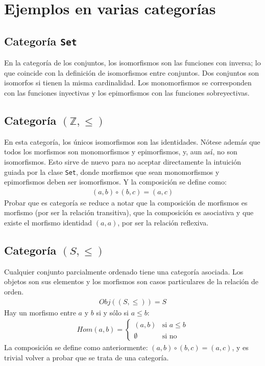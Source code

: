 \documentclass[11pt, fleqn, spanish]{book}
\newcommand{\twopartdef}[4]
{
  \left\{
    \begin{array}{ll}
      #1 & \mbox{si } #2 \\
      #3 & \mbox{si } #4
    \end{array}
  \right.
}
\begin{document}
  \section {Ejemplos en varias categorías}
    \subsection{Categoría \texttt{Set}}
      En la categoría de los conjuntos, los isomorfismos son las funciones con inversa; lo
      que coincide con la definición de isomorfismos entre conjuntos. Dos conjuntos son
      isomorfos si tienen la misma cardinalidad.
      Los monomorfismos se corresponden con las funciones inyectivas y los epimorfismos con
      las funciones sobreyectivas.
    
    \subsection{Categoría \texttt{$(\mathbb{Z},\leq)$}}
      En esta categoría, los únicos isomorfismos son las identidades. Nótese además
      que todos los morfismos son monomorfismos y epimorfismos, y, aun así, no son
      isomorfismos. Esto sirve de nuevo para no aceptar directamente la intuición
      guiada por la clase \texttt{Set}, donde morfismos que sean monomorfismos y
      epimorfismos deben ser isomorfismos.
      Y la composición se define como:
      \begin{align*}
       (a,b) \circ (b,c) = (a,c)
      \end{align*}
      Probar que es categoría se reduce a notar que la composición de morfismos es morfismo (por
      ser la relación transitiva), que la composición es asociativa y que existe el morfismo identidad
      $(a,a)$, por ser la relación reflexiva.
     
    \subsection{Categoría \texttt{$(S,\leq)$}}
      Cualquier conjunto parcialmente ordenado tiene una categoría asociada. Los objetos
      son sus elementos y los morfismos son casos particulares de la relación de orden.
      \begin{gather*}
        Obj((S,\leq)) = S
      \end{gather*}
      Hay un morfismo entre $a$ y $b$ si y sólo si $a \leq b$:
      \begin{align*}
        Hom(a,b)= \twopartdef{(a,b)}{a \leq b}{\emptyset}{\mbox{no}}
      \end{align*}
      La composición se define como anteriormente: $(a,b) \circ (b,c) = (a,c)$, y es
      trivial volver a probar que se trata de una categoría.
      \medskip
      
\end{document}
